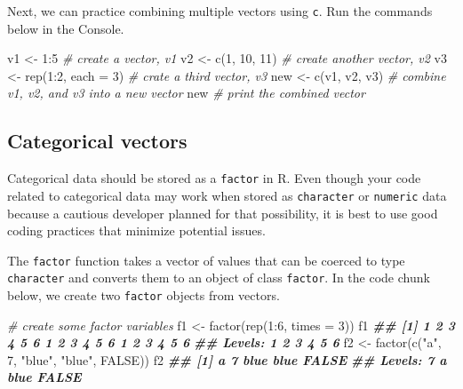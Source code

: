 \documentclass[
]{book}
\newenvironment{Shaded}{\begin{snugshade}}{\end{snugshade}}
\newcommand{\AttributeTok}[1]{\textcolor[rgb]{0.77,0.63,0.00}{#1}}
\newcommand{\CommentTok}[1]{\textcolor[rgb]{0.56,0.35,0.01}{\textit{#1}}}
\newcommand{\ConstantTok}[1]{\textcolor[rgb]{0.00,0.00,0.00}{#1}}
\newcommand{\DecValTok}[1]{\textcolor[rgb]{0.00,0.00,0.81}{#1}}
\newcommand{\DocumentationTok}[1]{\textcolor[rgb]{0.56,0.35,0.01}{\textbf{\textit{#1}}}}
\newcommand{\FunctionTok}[1]{\textcolor[rgb]{0.00,0.00,0.00}{#1}}
\newcommand{\NormalTok}[1]{#1}
\newcommand{\OtherTok}[1]{\textcolor[rgb]{0.56,0.35,0.01}{#1}}
\newcommand{\SpecialCharTok}[1]{\textcolor[rgb]{0.00,0.00,0.00}{#1}}
\newcommand{\StringTok}[1]{\textcolor[rgb]{0.31,0.60,0.02}{#1}}
\theoremstyle{definition}
\theoremstyle{definition}
\theoremstyle{definition}
\theoremstyle{definition}
\theoremstyle{remark}
\begin{document}
\begin{yourturn}
Next, we can practice combining multiple vectors using \texttt{c}.
Run the commands below in the Console.

\begin{Shaded}
\begin{Highlighting}[]
\NormalTok{v1 }\OtherTok{\textless{}{-}} \DecValTok{1}\SpecialCharTok{:}\DecValTok{5} \CommentTok{\# create a vector, v1}
\NormalTok{v2 }\OtherTok{\textless{}{-}} \FunctionTok{c}\NormalTok{(}\DecValTok{1}\NormalTok{, }\DecValTok{10}\NormalTok{, }\DecValTok{11}\NormalTok{) }\CommentTok{\# create another vector, v2}
\NormalTok{v3 }\OtherTok{\textless{}{-}} \FunctionTok{rep}\NormalTok{(}\DecValTok{1}\SpecialCharTok{:}\DecValTok{2}\NormalTok{, }\AttributeTok{each =} \DecValTok{3}\NormalTok{) }\CommentTok{\# crate a third vector, v3}
\NormalTok{new }\OtherTok{\textless{}{-}} \FunctionTok{c}\NormalTok{(v1, v2, v3) }\CommentTok{\# combine v1, v2, and v3 into a new vector}
\NormalTok{new }\CommentTok{\# print the combined vector}
\end{Highlighting}
\end{Shaded}

\end{yourturn}

\hypertarget{categorical-vectors}{%
\subsection{Categorical vectors}\label{categorical-vectors}}

Categorical data should be stored as a \texttt{factor} in R. Even though your code related to categorical data may work when stored as \texttt{character} or \texttt{numeric} data because a cautious developer planned for that possibility, it is best to use good coding practices that minimize potential issues.

The \texttt{factor} function takes a vector of values that can be coerced to type \texttt{character} and converts them to an object of class \texttt{factor}. In the code chunk below, we create two \texttt{factor} objects from vectors.

\begin{Shaded}
\begin{Highlighting}[]
\CommentTok{\# create some factor variables}
\NormalTok{f1 }\OtherTok{\textless{}{-}} \FunctionTok{factor}\NormalTok{(}\FunctionTok{rep}\NormalTok{(}\DecValTok{1}\SpecialCharTok{:}\DecValTok{6}\NormalTok{, }\AttributeTok{times =} \DecValTok{3}\NormalTok{))}
\NormalTok{f1}
\DocumentationTok{\#\#  [1] 1 2 3 4 5 6 1 2 3 4 5 6 1 2 3 4 5 6}
\DocumentationTok{\#\# Levels: 1 2 3 4 5 6}
\NormalTok{f2 }\OtherTok{\textless{}{-}} \FunctionTok{factor}\NormalTok{(}\FunctionTok{c}\NormalTok{(}\StringTok{"a"}\NormalTok{, }\DecValTok{7}\NormalTok{, }\StringTok{"blue"}\NormalTok{, }\StringTok{"blue"}\NormalTok{, }\ConstantTok{FALSE}\NormalTok{))}
\NormalTok{f2}
\DocumentationTok{\#\# [1] a     7     blue  blue  FALSE}
\DocumentationTok{\#\# Levels: 7 a blue FALSE}
\end{Highlighting}
\end{Shaded}
\end{document}
